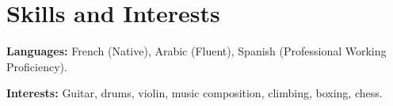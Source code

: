 \documentclass{Resume}
\begin{document}

\section{Skills and Interests}
\noindent\textbf{Languages: }\textnormal{French (Native), Arabic (Fluent), Spanish (Professional Working Proficiency).}

\noindent\textbf{Interests: }\textnormal{Guitar, drums, violin, music composition, climbing, boxing, chess.}
\end{document}
